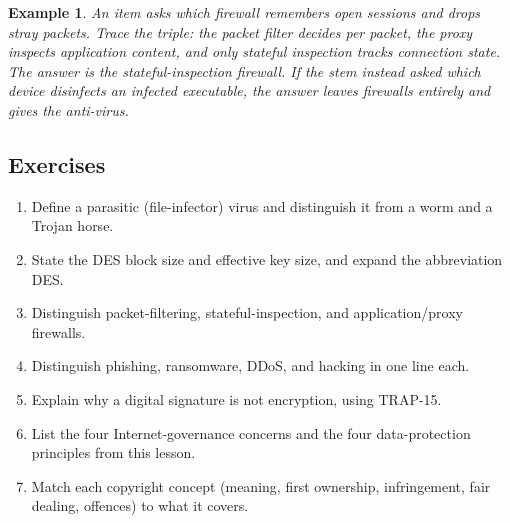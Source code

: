 \documentclass[11pt]{article}
\newtheorem{example}{Example}[section]
\begin{document}
\begin{example}
An item asks which firewall remembers open sessions and drops stray packets.
Trace the triple: the packet filter decides per packet, the proxy inspects
application content, and only stateful inspection tracks connection state.
The answer is the stateful-inspection firewall. If the stem instead asked
which device disinfects an infected executable, the answer leaves firewalls
entirely and gives the anti-virus.
\end{example}

\subsection*{Exercises}
\begin{enumerate}[label=\arabic*.]
  \item Define a parasitic (file-infector) virus and distinguish it from a worm and a Trojan horse.
  \item State the DES block size and effective key size, and expand the abbreviation DES.
  \item Distinguish packet-filtering, stateful-inspection, and application/proxy firewalls.
  \item Distinguish phishing, ransomware, DDoS, and hacking in one line each.
  \item Explain why a digital signature is not encryption, using TRAP-15.
  \item List the four Internet-governance concerns and the four data-protection principles from this lesson.
  \item Match each copyright concept (meaning, first ownership, infringement, fair dealing, offences) to what it covers.
\end{enumerate}
\end{document}
